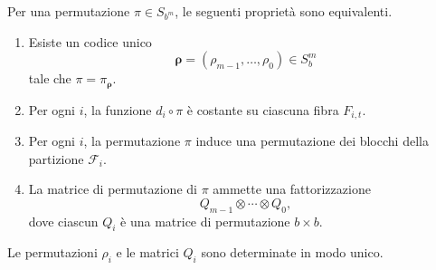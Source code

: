 	\begin{theorem}\label{thm:caratterizzazione-separabile}
		Per una permutazione \(\pi\in S_{b^m}\), le seguenti proprietà sono
		equivalenti.
		\begin{enumerate}
			\item Esiste un codice unico
			\[
			\boldsymbol{\rho}
			=(\rho_{m-1},\dots,\rho_0)\in S_b^m
			\]
			tale che \(\pi=\pi_{\boldsymbol{\rho}}\).

			\item Per ogni \(i\), la funzione \(d_i\circ\pi\) è costante su ciascuna
			fibra \(F_{i,t}\).

			\item Per ogni \(i\), la permutazione \(\pi\) induce una permutazione dei
			blocchi della partizione \(\mathcal F_i\).

			\item La matrice di permutazione di \(\pi\) ammette una fattorizzazione
			\[
			Q_{m-1}\otimes\cdots\otimes Q_0,
			\]
			dove ciascun \(Q_i\) è una matrice di permutazione \(b\times b\).
		\end{enumerate}
		Le permutazioni \(\rho_i\) e le matrici \(Q_i\) sono determinate in modo
		unico.
	\end{theorem}

